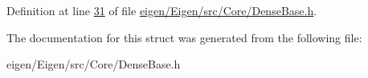 Definition at line \hyperlink{eigen_2_eigen_2src_2_core_2_dense_base_8h_source_l00031}{31} of file \hyperlink{eigen_2_eigen_2src_2_core_2_dense_base_8h_source}{eigen/\+Eigen/src/\+Core/\+Dense\+Base.\+h}.



The documentation for this struct was generated from the following file\+:\begin{DoxyCompactItemize}
\item 
eigen/\+Eigen/src/\+Core/\+Dense\+Base.\+h\end{DoxyCompactItemize}

